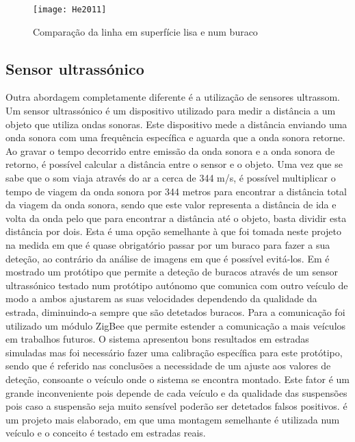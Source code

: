 \begin{figure}[htbp]
	\centering
	\texttt{[image: He2011]}
	\caption[Comparação da linha em superfície lisa e num buraco]{Comparação da linha em superfície lisa e num buraco \footnotemark}
	\label{fig:sensor_kinect}
\end{figure}
\vspace{5cm}

\subsection{Sensor ultrassónico}
\label{subsec:sensor_ultrassonico}
Outra abordagem completamente diferente é a utilização de sensores ultrassom.
Um sensor ultrassónico é um dispositivo utilizado para medir a distância a um objeto que utiliza ondas sonoras. Este dispositivo mede a distância enviando uma onda sonora com uma frequência específica e aguarda que a onda sonora retorne.
Ao gravar o tempo decorrido entre emissão da onda sonora e a onda sonora de retorno, é possível calcular a distância entre o sensor e o objeto.
Uma vez que se sabe que o som viaja através do ar a cerca de 344 m/s, é possível multiplicar o tempo de viagem da onda sonora por 344 metros para encontrar a distância total da viagem da onda sonora, sendo que este valor representa a distância de ida e volta da onda pelo que para encontrar a distância até o objeto, basta dividir esta distância por dois.
Esta é uma opção semelhante à que foi tomada neste projeto na medida em que é quase obrigatório passar por um buraco para fazer a sua deteção, ao contrário da análise de imagens em que é possível evitá-los. 
Em \cite{Hegde2015} é mostrado um protótipo que permite a deteção de buracos através de um sensor ultrassónico testado num protótipo autónomo que comunica com outro veículo de modo a ambos ajustarem as suas velocidades dependendo da qualidade da estrada, diminuindo-a sempre que são detetados buracos.
Para a comunicação foi utilizado um módulo ZigBee que permite estender a comunicação a mais veículos em trabalhos futuros.
O sistema apresentou bons resultados em estradas simuladas mas foi necessário fazer uma calibração específica para este protótipo, sendo que é referido nas conclusões a necessidade de um ajuste aos valores de deteção, consoante o veículo onde o sistema se encontra montado.
Este fator é um grande inconveniente pois depende de cada veículo e da qualidade das suspensões pois caso a suspensão seja muito sensível poderão ser detetados falsos positivos.
\cite{Madli2015} é um projeto mais elaborado, em que uma montagem semelhante é utilizada num veículo e o conceito é testado em estradas reais.
